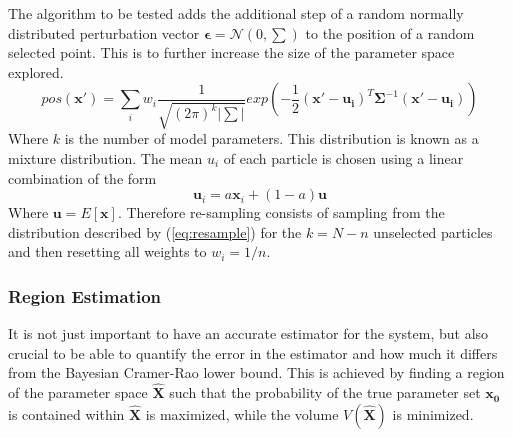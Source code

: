 The algorithm to be tested adds the additional step of a random normally distributed perturbation vector $\mathbf{\epsilon}= \mathcal{N}(0,\sum \limits)$ to the position of a random selected point. This is to further increase the size of the parameter space explored.\cite{hamiltonian_learning}
\begin{equation}
pos(\mathbf{x'}) = \sum \limits_i w_i \frac{1}{\sqrt{(2\pi)^k|\sum|}}exp\left(-\frac{1}{2}(\mathbf{x'}-\mathbf{u_i})^T\mathbf{\Sigma}^{-1}(\mathbf{x'}-\mathbf{u_i})\right)
\label{eq:resample}
\end{equation}
Where $k$ is the number of model parameters. This distribution is known as a mixture distribution. The mean $u_i$ of each particle is chosen using a linear combination of the form 
\begin{equation}
\mathbf{u}_i = a\mathbf{x}_i + (1-a)\mathbf{u}
\end{equation}
Where $\mathbf{u}= E[\mathbf{x}]$. Therefore re-sampling consists of sampling from the distribution described by (\ref{eq:resample}) for the $k=N-n$ unselected particles and then resetting all weights to $w_i = 1/n$.  
\subsubsection{Region Estimation}
It is not just important to have an accurate estimator for the system, but also crucial to be able to quantify the error in the estimator and how much it differs from the  Bayesian Cramer-Rao lower bound. This is achieved by finding a region of the parameter space $\mathbf{\hat{X}}$ such that the probability of the true parameter set $\mathbf{x_0}$ is contained within $\mathbf{\hat{X}}$ is maximized, while the volume $V(\mathbf{\hat{X}})$ is minimized.\cite{hamiltonian_learning}

